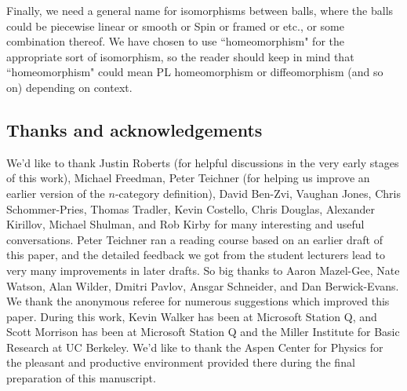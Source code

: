 Finally, we need a general name for isomorphisms between balls, where the balls could be
piecewise linear or smooth or Spin or framed or etc., or some combination thereof.
We have chosen to use ``homeomorphism" for the appropriate sort of isomorphism, so the reader should
keep in mind that ``homeomorphism" could mean PL homeomorphism or diffeomorphism (and so on)
depending on context.

\subsection{Thanks and acknowledgements}
We'd like to thank 
Justin Roberts (for helpful discussions in the very early stages of this work), 
Michael Freedman, 
Peter Teichner (for helping us improve an earlier version of the $n$-category definition), 
David Ben-Zvi, 
Vaughan Jones, 
Chris Schommer-Pries, 
Thomas Tradler,
Kevin Costello, 
Chris Douglas,
Alexander Kirillov,
Michael Shulman,
and
Rob Kirby
for many interesting and useful conversations. 
Peter Teichner ran a reading course based on an earlier draft of this paper, and the detailed feedback
we got from the student lecturers lead to very many improvements in later drafts.
So big thanks to
Aaron Mazel-Gee,
Nate Watson,
Alan Wilder,
Dmitri Pavlov,
Ansgar Schneider,
and
Dan Berwick-Evans.
We thank the anonymous referee for numerous suggestions which improved this paper.
During this work, Kevin Walker has been at Microsoft Station Q, and Scott Morrison has been at 
Microsoft Station Q and the Miller Institute for Basic Research at UC Berkeley. 
We'd like to thank the Aspen Center for Physics for the pleasant and productive 
environment provided there during the final preparation of this manuscript.

